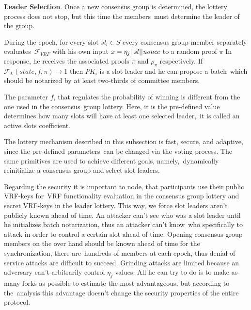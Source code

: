\textbf{Leader Selection}.
Once a new consensus group is determined, the lottery process does not stop, but this time the members\
must determine the leader of the group.

During the epoch, for every slot ${sl_l \in S}$ every consensus group member separately evaluates\
${\mathcal{F}}_{VRF}$ with his own input ${x = \eta_j || sl || \emph{nonce}}$ to a random proof  $\pi$
In response, he receives the associated proofs $\pi$ and $\rho_\pi$ respectively.
If ${\mathcal{F}}_{L}(state, f, \pi) \rightarrow 1$ then $PK_i$ is a slot leader and he can propose a batch\
which should be notarized by at least two-thirds of committee members.

The parameter $f$, that regulates the probability of winning is different from the one used in the consensus\
group lottery.
Here, it is the pre-defined value determines how many slots will have at least one selected leader,\
it is called an active slots coefficient.

The lottery mechanism described in this subsection is fast, secure, and adaptive, since the pre-defined parameters\
can be changed via the voting process.
The same primitives are used to achieve different goals, namely,\
dynamically reinitialize a consensus group and select slot leaders.

Regarding the security it is important to node, that participants use their public VRF-keys for\
VRF functionality evaluation in the consensus group lottery and secret VRF-keys in the leader lottery.
This way, we force slot leaders aren't publicly known ahead of time.
An attacker can't see who was a slot leader until he initializes batch notarization, thus an attacker can't know\
who specifically to attack in order to control a certain slot ahead of time.
Opening consensus group members on the over hand should be known ahead of time for the synchronization, there are\
hundreds of members at each epoch, thus denial of service attacks are difficult to succeed.
Grinding attacks are limited because an adversary can't arbitrarily control $\eta_j$ values.
All he can try to do is to make as many forks as possible to estimate the most advantageous, but according to the\
analysis this advantage doesn't change the security properties of the entire protocol.

